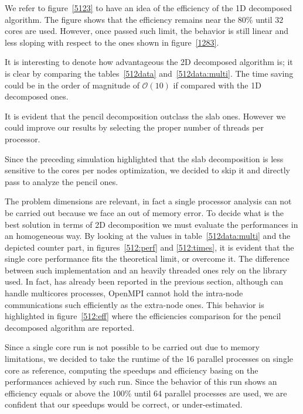 \par
We refer to figure~\ref{5123} to have an idea of the efficiency of the 1D decomposed algorithm. The figure shows that the efficiency remains near the $80\%$ until $32$ cores are used. However, once passed such limit, the behavior is still linear and less sloping with  respect to the ones shown in figure~\ref{1283}.  \\
\par
It is interesting to denote how advantageous the 2D decomposed algorithm is; it is clear by comparing the tables~\ref{512data} and~\ref{512data:multi}. The time saving could be in the order of magnitude of $\mathcal{O}(10)$ if compared with the 1D decomposed ones.\\
\par
It is evident that the pencil decomposition outclass the slab ones. However we could improve our results by selecting the proper number of threads per processor. 
\par
Since the preceding simulation highlighted that the slab decomposition is less sensitive to the cores per nodes optimization, we decided to skip it and directly pass to analyze the pencil ones. \par
The problem dimensions are relevant, in fact a single processor analysis can not be carried out because we face an out of memory error.
To decide what is the best solution in terms of 2D decomposition we must evaluate the performances in an homogeneous way. 
By looking at the values in table~\ref{512data:multi} and the depicted counter part, in figures~\ref{512:perf} and \ref{512:times}, it is evident that the single core performance fits the theoretical limit, or overcome it. The difference between such implementation and an heavily threaded ones rely on the library used. In fact, has already been reported in the previous section, although can handle multicores processes, OpenMPI cannot hold the intra-node communications such efficiently as the extra-node ones. This behavior is highlighted in figure~\ref{512:eff} where the efficiencies comparison for the pencil decomposed algorithm are reported.
\par
Since a single core run is not possible to be carried out due to memory limitations, we decided to take the runtime of the 16 parallel processes on single core as reference, computing the speedups and efficiency basing on the performances achieved by such run. Since the behavior of this run shows an efficiency equals or above the $100\%$ until 64 parallel processes are used, we are confident that our speedups would be correct, or under-estimated.

